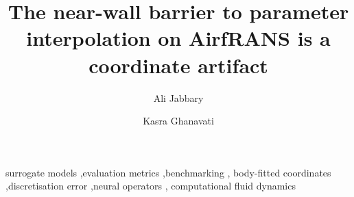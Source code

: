 \documentclass[preprint,12pt,a4paper]{elsarticle}
\begin{document}
\begin{frontmatter}

\title{The near-wall barrier to parameter interpolation on AirfRANS
       is a coordinate artifact}

\author[urmia]{Ali Jabbary}

\author[gre]{Kasra Ghanavati}


\begin{abstract}

\end{abstract}

\begin{keyword}
surrogate models \sep evaluation metrics \sep benchmarking \sep
body-fitted coordinates \sep discretisation error \sep neural operators \sep
computational fluid dynamics
\end{keyword}

\end{frontmatter}





\end{document}

